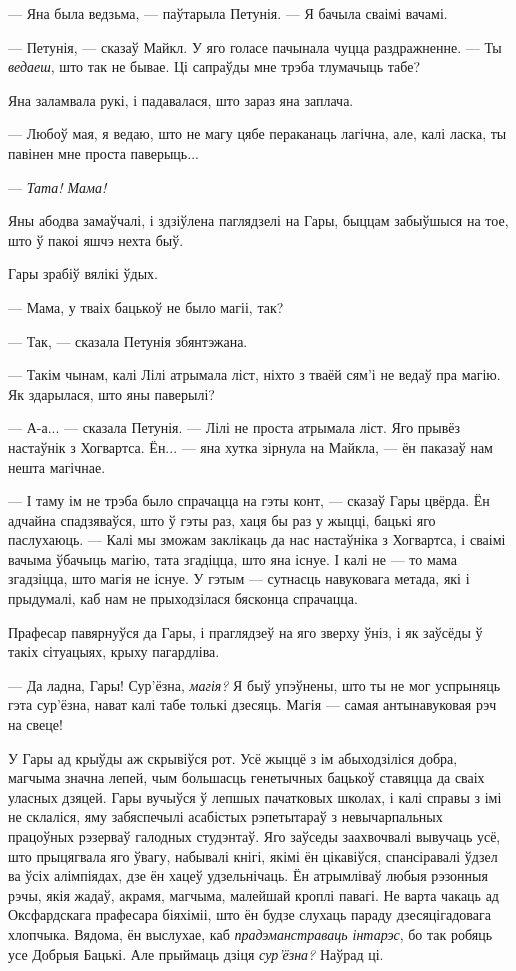 --- Яна была ведзьма, --- паўтарыла Петунія. --- Я бачыла сваімі вачамі.

--- Петунія, --- сказаў Майкл. У яго голасе пачынала чуцца раздражненне. --- Ты \emph{ведаеш}, што
так не бывае. Ці сапраўды мне трэба тлумачыць табе?

Яна заламвала рукі, і падавалася, што зараз яна заплача.

--- Любоў мая, я ведаю, што не магу цябе пераканаць лагічна, але, калі ласка, ты павінен мне 
проста паверыць...

--- \emph{Тата! Мама!}

Яны абодва замаўчалі, і здзіўлена паглядзелі на Гары, быццам забыўшыся на тое, што ў пакоі 
яшчэ нехта быў.

Гары зрабіў вялікі ўдых.

--- Мама, у тваіх бацькоў не было магіі, так?

--- Так, --- сказала Петунія збянтэжана.

--- Такім чынам, калі Лілі атрымала ліст, ніхто з тваёй сям'і не ведаў пра магію. Як здарылася,
што яны паверылі?

--- А-а... --- сказала Петунія. --- Лілі не проста атрымала ліст. Яго прывёз настаўнік з Хогвартса.
Ён... --- яна хутка зірнула на Майкла, --- ён паказаў нам нешта магічнае.

--- І таму ім не трэба было спрачацца на гэты конт, --- сказаў Гары цвёрда. Ён адчайна спадзяваўся,
што ў гэты раз, хаця бы раз у жыцці, бацькі яго паслухаюць. --- Калі мы зможам заклікаць да нас
настаўніка з Хогвартса, і сваімі вачыма ўбачыць магію, тата згадіцца, што яна існуе. І калі не ---
то мама згадзіцца, што магія не існуе. У гэтым --- сутнасць навуковага метада, які і прыдумалі, каб
нам не прыходзілася бясконца спрачацца.

Прафесар павярнуўся да Гары, і праглядзеў на яго зверху ўніз, і як заўсёды ў такіх сітуацыях,
крыху пагардліва.

--- Да ладна, Гары! Сур'ёзна, \emph{магія?} Я быў упэўнены, што ты не мог успрыняць гэта сур'ёзна,
нават калі табе толькі дзесяць. Магія --- самая антынавуковая рэч на свеце!

У Гары ад крыўды аж скрывіўся рот. Усё жыццё з ім абыходзіліся добра, магчыма значна лепей, чым
большасць генетычных бацькоў ставяцца да сваіх уласных дзяцей. Гары вучыўся ў лепшых пачатковых
школах, і калі справы з імі не склаліся, яму забяспечылі асабістых рэпетытараў з невычарпальных
працоўных рэзерваў галодных студэнтаў. Яго заўседы заахвочвалі вывучаць усё, што прыцягвала яго
ўвагу, набывалі кнігі, якімі ён цікавіўся, спансіравалі ўдзел ва ўсіх алімпіядах, дзе ён хацеў
удзельнічаць. Ён атрымліваў любыя рэзонныя рэчы, якія жадаў, акрамя, магчыма, малейшай кроплі 
павагі. Не варта чакаць ад Оксфардскага прафесара біяхіміі, што ён будзе слухаць
параду дзесяцігадовага хлопчыка. Вядома, ён выслухае, каб \emph{прадэманстраваць інтарэс},
бо так робяць усе Добрыя Бацькі. Але прыймаць дзіця \emph{сур'ёзна?} Наўрад ці. 

